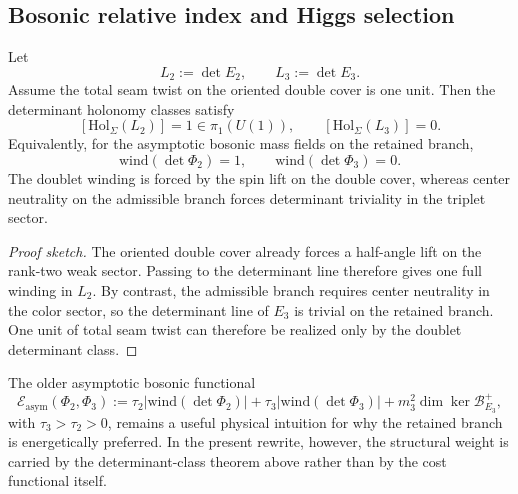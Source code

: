 \subsection{Bosonic relative index and Higgs selection}

\begin{theorem}
\label{thm:determinant-class-higgs-selection}
Let
\[
L_2:=\det E_2,
\qquad
L_3:=\det E_3.
\]
Assume the total seam twist on the oriented double cover is one unit. Then the determinant holonomy classes satisfy
\[
[\mathrm{Hol}_\Sigma(L_2)]=1\in\pi_1(U(1)),
\qquad
[\mathrm{Hol}_\Sigma(L_3)]=0.
\]
Equivalently, for the asymptotic bosonic mass fields on the retained branch,
\[
\mathrm{wind}(\det\Phi_2)=1,
\qquad
\mathrm{wind}(\det\Phi_3)=0.
\]
The doublet winding is forced by the spin lift on the double cover, whereas center neutrality on the admissible branch forces determinant triviality in the triplet sector.
\end{theorem}

\begin{proof}[Proof sketch]
The oriented double cover already forces a half-angle lift on the rank-two weak sector. Passing to the determinant line therefore gives one full winding in $L_2$. By contrast, the admissible branch requires center neutrality in the color sector, so the determinant line of $E_3$ is trivial on the retained branch. One unit of total seam twist can therefore be realized only by the doublet determinant class.
\end{proof}

\begin{remark}
The older asymptotic bosonic functional
\[
\mathcal E_{\mathrm{asym}}(\Phi_2,\Phi_3)
:=
\tau_2\bigl|\mathrm{wind}(\det\Phi_2)\bigr|
+\tau_3\bigl|\mathrm{wind}(\det\Phi_3)\bigr|
+m_3^2\dim\ker\mathcal B_{E_3}^+,
\]
with $\tau_3>\tau_2>0$, remains a useful physical intuition for why the retained branch is energetically preferred. In the present rewrite, however, the structural weight is carried by the determinant-class theorem above rather than by the cost functional itself.
\end{remark}

